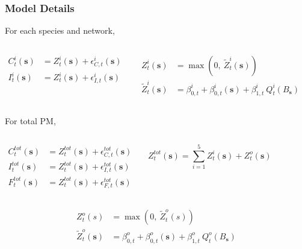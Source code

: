 \documentclass[t]{beamer}\usepackage[]{graphicx}\usepackage[]{color}
\begin{document}
\begin{frame}
\frametitle{Model Details}

For each species and network,

\vspace{-5mm}

\begin{columns}[t]
\begin{align*}
C_t^i(\bm{s}) &= Z_t^i(\bm{s}) + \epsilon_{C,t}^i(\bm{s}) \\
I_t^i(\bm{s}) &= Z_t^i(\bm{s}) + \epsilon_{I,t}^i(\bm{s}) \\
\end{align*}

\begin{align*}
{Z}_t^i(\bm{s}) &= \max{}\left(0,~\widetilde{Z}_t^i(\bm{s})\right) \\
\widetilde{Z}_t^i(\bm{s}) &= \beta_{0,t}^i +\beta_{0,t}^i(\bm{s}) + \beta_{1,t}^i \: Q_t^i(B_{\bm{s}})  
\end{align*}
\end{columns}

\vspace{2mm} \pause

For total PM,
\begin{columns}[c]
\begin{align*}
C_t^{tot}(\bm{s}) &= Z_t^{tot}(\bm{s}) + \epsilon_{C,t}^{tot}(\bm{s}) \\
I_t^{tot}(\bm{s}) &= Z_t^{tot}(\bm{s}) + \epsilon_{I,t}^{tot}(\bm{s}) \\
F_t^{tot}(\bm{s}) &= Z_t^{tot}(\bm{s}) + \epsilon_{F,t}^{tot}(\bm{s})
\end{align*}

\vspace{6mm}
\[ Z^{tot}_{t}(\bm{s}) = \sum_{i=1}^{5} Z^i_t(\bm{s}) + Z^{o}_{t}(\bm{s}) \]
\end{columns}

\vspace{3mm} \pause

\begin{align*}
{Z}_t^o(s) &= \max{}\left(0,~\widetilde{Z}_t^o(s)\right) \\
\widetilde{Z}_t^{o}(\bm{s}) &= \beta_{0,t}^o +\beta_{0,t}^o(\bm{s}) + \beta_{1,t}^o \: Q_t^o(B_{\bm{s}})
\end{align*}

\end{frame}
\end{document}
